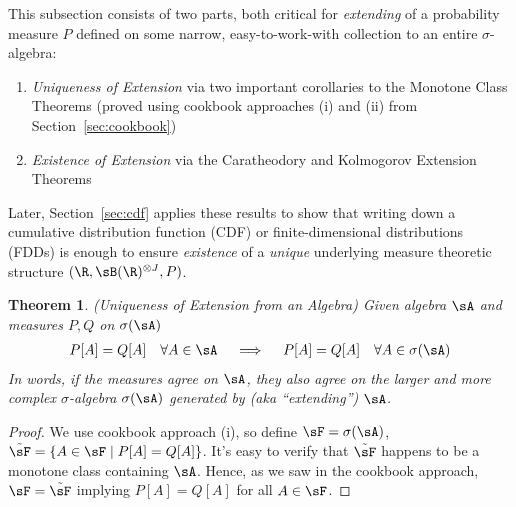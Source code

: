 \documentclass[12pt]{article}
\theoremstyle{plain}
\newtheorem{thm}{Theorem}[section]
\theoremstyle{definition}
\theoremstyle{remark}
\newcommand{\ninf}{_{n=1}^\infty}
\begin{document}
This subsection consists of two parts, both critical for
\emph{extending} of a probability measure $P$ defined on some narrow,
easy-to-work-with collection to an entire $\sigma$-algebra:
\begin{enumerate}[label=(\roman*)]
  \item \emph{Uniqueness of Extension} via two important corollaries to
    the Monotone Class Theorems (proved using cookbook approaches (i)
    and (ii) from Section~\ref{sec:cookbook})
  \item \emph{Existence of Extension} via the Caratheodory and
    Kolmogorov Extension Theorems
\end{enumerate}
Later, Section~\ref{sec:cdf} applies these results to show that writing
down a cumulative distribution function (CDF) or finite-dimensional
distributions (FDDs) is enough to ensure \emph{existence} of a
\emph{unique} underlying measure theoretic structure
$(\R,\sB(\R)^{\otimes J},P)$.


\begin{thm}\emph{(Uniqueness of Extension from an Algebra)}
Given algebra $\sA$ and measures $P,Q$ on $\sigma(\sA)$
\begin{align*}
  P[A]=Q[A]
  \quad \forall A\in\sA
  \quad\implies\quad
  P[A]=Q[A]
  \quad \forall A\in\sigma(\sA)
\end{align*}
In words, if the measures agree on $\sA$, they also agree on the larger
and more complex $\sigma$-algebra $\sigma(\sA)$ generated by
(aka ``extending'') $\sA$.
\end{thm}
\begin{proof}
We use cookbook approach (i), so define $\sF = \sigma(\sA)$,
$\tilde{\sF} = \{A\in \sF\;|\;P[A]=Q[A]\}$.
It's easy to verify that $\tilde{\sF}$ happens to be a monotone class
containing $\sA$.
Hence, as we saw in the cookbook approach,
$\sF=\tilde{\sF}$ implying $P[A]=Q[A]$ for all $A\in\sF$.
\end{proof}
\end{document}
